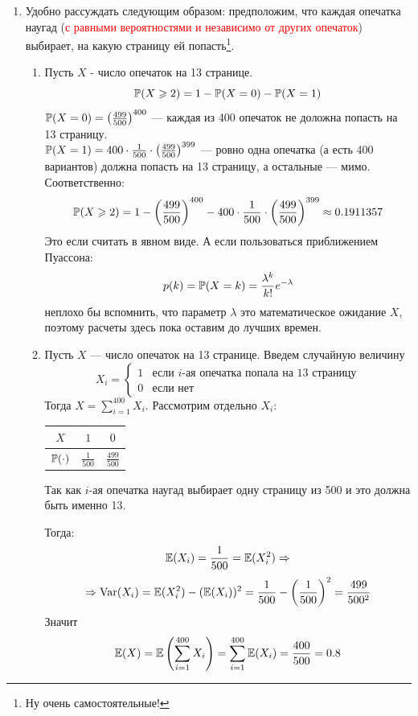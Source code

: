 \documentclass[12pt, a4paper]{article}\usepackage[]{graphicx}\usepackage[]{color}
\begin{document}
\begin{enumerate}
\item
Удобно рассуждать следующим образом: предположим, что каждая опечатка наугад (\textcolor{red}{с равными вероятностями и независимо от других опечаток}) выбирает, на какую страницу ей попасть\footnote[1]{Ну очень самостоятельные!}.

\begin{enumerate}
\item Пусть $X$ - число опечаток на 13 странице. \[\P(X \geqslant 2) = 1 - \P(X=0) - \P(X=1) \]
$\P(X=0) = \left( \frac{499}{500} \right)^{400}$ — каждая из 400 опечаток не доложна попасть на 13 страницу.\\
$\P(X=1) = 400\cdot\frac{1}{500}\cdot\left( \frac{499}{500} \right)^{399}$ — ровно одна опечатка (а есть 400 вариантов) должна попасть на 13 страницу, а остальные — мимо. Соответственно:
\[
\P(X \geqslant 2) = 1 - \left( \frac{499}{500} \right)^{400} - 400\cdot\frac{1}{500}\cdot\left( \frac{499}{500} \right)^{399} \approx 0.1911357
\]
Это если считать в явном виде. А если пользоваться приближением Пуассона:
\[
p(k) = \P(X = k) = \frac{\lambda^k}{k!}e^{-\lambda}
\]
неплохо бы вспомнить, что параметр $\lambda$ это математическое ожидание $X$, поэтому расчеты здесь пока оставим до лучших времен.

\item Пусть $X$ — число опечаток на 13 странице. Введем случайную величину
\[X_i =
\begin{cases}
1 & \text{если } i\text{-ая опечатка попала на 13 страницу}\\
0 & \text{если нет}
\end{cases}
\]
Тогда $X = \sum\limits_{i=1}^{400}X_i$. Рассмотрим отдельно $X_i$:

\begin{tabular}{@{}ccc@{}}
\toprule
$X$         & $1$             & $0$               \\ \midrule
$\P(\cdot)$ & $\frac{1}{500}$ & $\frac{499}{500}$ \\ \bottomrule
\end{tabular}

Так как $i$-ая опечатка наугад выбирает одну страницу из 500 и это должна быть именно 13.

Тогда:
\[
\E(X_i) = \frac{1}{500} = \E(X^2_i) \Rightarrow
\]
\[
\Rightarrow \Var(X_i) = \E(X^2_i) - (\E(X_i))^2 = \frac{1}{500} - \left(\frac{1}{500}\right)^2 = \frac{499}{500^2}
\]
Значит
\[
\E(X) = \E\left(\sum\limits_{i=1}^{400}X_i\right) = \sum\limits_{i=1}^{400}\E(X_i)  = \frac{400}{500} = 0.8
\]


\end{enumerate}
\end{enumerate}
\end{document}
